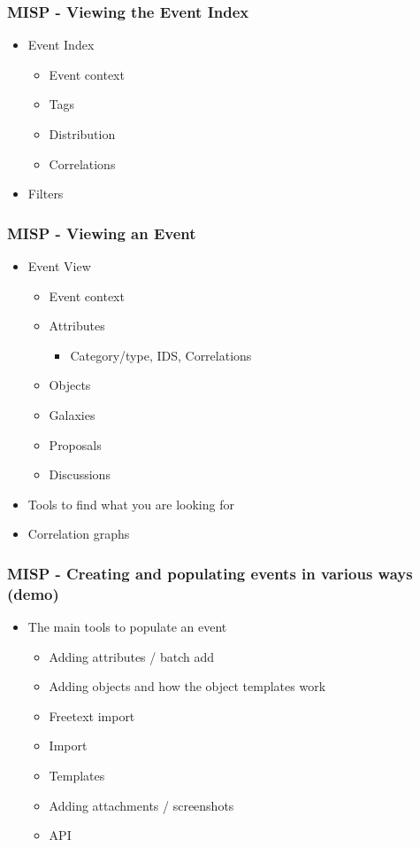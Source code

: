 \begin{frame}
    \frametitle{MISP - Viewing the Event Index}
    \begin{itemize}
    \item Event Index
        \begin{itemize}
            \item Event context
            \item Tags
            \item Distribution
            \item Correlations
        \end{itemize}
    \item Filters
    \end{itemize}
\end{frame}

\begin{frame}
    \frametitle{MISP - Viewing an Event}
    \begin{itemize}
     \item Event View
        \begin{itemize}
            \item Event context
            \item Attributes
            \begin{itemize}
                \item Category/type, IDS, Correlations
            \end{itemize}
            \item Objects
            \item Galaxies
            \item Proposals
            \item Discussions
        \end{itemize}
    \item Tools to find what you are looking for
    \item Correlation graphs
    \end{itemize}
\end{frame}

\begin{frame}
    \frametitle{MISP - Creating and populating events in various ways (demo)}
    \begin{itemize}
    \item The main tools to populate an event
        \begin{itemize}
            \item Adding attributes / batch add
            \item Adding objects and how the object templates work
            \item Freetext import
            \item Import
            \item Templates
            \item Adding attachments / screenshots
            \item API
        \end{itemize}
    \end{itemize}
\end{frame}

